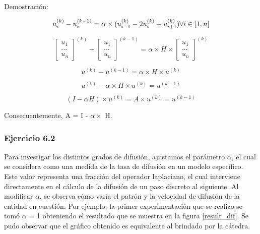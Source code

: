     Demostración:

    \begin{equation}
    u_{i}^{(k)} - u_{i}^{(k-1)} = \alpha \times (u_{i-1}^{(k)} - 2u_{i}^{(k)} + u_{i+1}^{(k)}) \space \forall i \in [1, n]
    \end{equation}

    \begin{equation}
    \begin{bmatrix}
    u_{1}\\
    ...\\
    u_{n}
    \end{bmatrix}^{(k)}
    -
    \begin{bmatrix}
    u_{1}\\
    ...\\
    u_{n}
    \end{bmatrix}^{(k-1)}
    =
    \alpha \times H \times
    \begin{bmatrix}
    u_{1}\\
    ...\\
    u_{n}
    \end{bmatrix}^{(k)}
    \end{equation}
    
    \begin{equation}
    u^{(k)} - u^{(k-1)} = \alpha \times H \times u^{(k)}
    \end{equation}
    
    \begin{equation}
    u^{(k)} - \alpha \times H \times u^{(k)} =  u^{(k-1)}
    \end{equation}
    
    \begin{equation}
    (I - \alpha H) \times u^{(k)} = A \times u^{(k)} =  u^{(k-1)}
    \end{equation}

    Consecuentemente, A = I - $\alpha \times$ H.
\fi

\iffalse
    \subsubsection{Ejercicio 6.2}
    Para investigar los distintos grados de difusión, ajustamos el parámetro $\alpha$, el cual se considera como una medida de la tasa de difusión en un modelo específico. Este valor representa una fracción del operador laplaciano, el cual interviene directamente en el cálculo de la difusión de un paso discreto al siguiente.
    Al modificar $\alpha$, se observa cómo varía el patrón y la velocidad de difusión de la entidad en cuestión. Por ejemplo, la primer experimentación que se realizo se tomó $\alpha$ = 1 obteniendo el resultado que se muestra en la figura \ref{result_dif}. Se pudo observar que el gráfico obtenido es equivalente al brindado por la cátedra.

